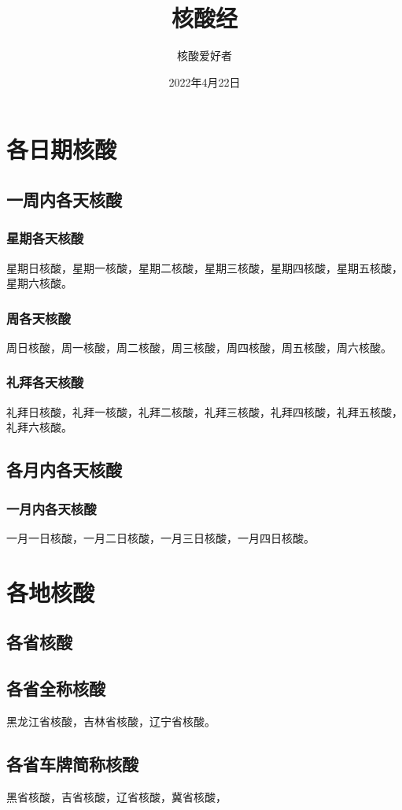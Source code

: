 \documentclass{ctexbook}
\title{核酸经}
\author{核酸爱好者}
\date{2022年4月22日}
\begin{document}
\maketitle

\tableofcontents

\chapter{各日期核酸}

\section{一周内各天核酸}

\subsection{星期各天核酸}
星期日核酸，星期一核酸，星期二核酸，星期三核酸，星期四核酸，星期五核酸，星期六核酸。

\subsection{周各天核酸}
周日核酸，周一核酸，周二核酸，周三核酸，周四核酸，周五核酸，周六核酸。

\subsection{礼拜各天核酸}
礼拜日核酸，礼拜一核酸，礼拜二核酸，礼拜三核酸，礼拜四核酸，礼拜五核酸，礼拜六核酸。

\section{各月内各天核酸}

\subsection{一月内各天核酸}
一月一日核酸，一月二日核酸，一月三日核酸，一月四日核酸。

\chapter{各地核酸}

\section{各省核酸}

\section{各省全称核酸}
黑龙江省核酸，吉林省核酸，辽宁省核酸。

\section{各省车牌简称核酸}
黑省核酸，吉省核酸，辽省核酸，冀省核酸，
\end{document}
